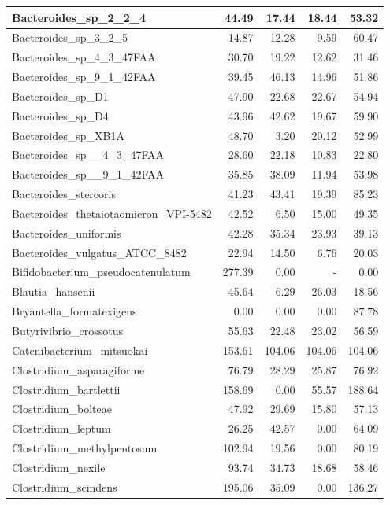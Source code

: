 \documentclass[12pt,a4paper]{article}
\begin{document}
\begin{table}[ht]
\begin{center}
\begin{tabular}{|l*{4}{|r}|}
Bacteroides\_sp\_2\_2\_4 & 44.49 & 17.44 & 18.44 & 53.32 \\ \hline
Bacteroides\_sp\_3\_2\_5 & 14.87 & 12.28 & 9.59 & 60.47 \\ \hline
Bacteroides\_sp\_4\_3\_47FAA & 30.70 & 19.22 & 12.62 & 31.46 \\ \hline
Bacteroides\_sp\_9\_1\_42FAA & 39.45 & 46.13 & 14.96 & 51.86 \\ \hline
Bacteroides\_sp\_D1 & 47.90 & 22.68 & 22.67 & 54.94 \\ \hline
Bacteroides\_sp\_D4 & 43.96 & 42.62 & 19.67 & 59.90 \\ \hline
Bacteroides\_sp\_XB1A & 48.70 & 3.20 & 20.12 & 52.99 \\ \hline
Bacteroides\_sp\_\_4\_3\_47FAA & 28.60 & 22.18 & 10.83 & 22.80 \\ \hline
Bacteroides\_sp\_\_9\_1\_42FAA & 35.85 & 38.09 & 11.94 & 53.98 \\ \hline
Bacteroides\_stercoris & 41.23 & 43.41 & 19.39 & 85.23 \\ \hline
Bacteroides\_thetaiotaomicron\_VPI-5482 & 42.52 & 6.50 & 15.00 & 49.35 \\ \hline
Bacteroides\_uniformis & 42.28 & 35.34 & 23.93 & 39.13 \\ \hline
Bacteroides\_vulgatus\_ATCC\_8482 & 22.94 & 14.50 & 6.76 & 20.03 \\ \hline
Bifidobacterium\_pseudocatenulatum & 277.39 & 0.00 & - & 0.00 \\ \hline
Blautia\_hansenii & 45.64 & 6.29 & 26.03 & 18.56 \\ \hline
Bryantella\_formatexigens & 0.00 & 0.00 & 0.00 & 87.78 \\ \hline
Butyrivibrio\_crossotus & 55.63 & 22.48 & 23.02 & 56.59 \\ \hline
Catenibacterium\_mitsuokai & 153.61 & 104.06 & 104.06 & 104.06 \\ \hline
Clostridium\_asparagiforme & 76.79 & 28.29 & 25.87 & 76.92 \\ \hline
Clostridium\_bartlettii & 158.69 & 0.00 & 55.57 & 188.64 \\ \hline
Clostridium\_bolteae & 47.92 & 29.69 & 15.80 & 57.13 \\ \hline
Clostridium\_leptum & 26.25 & 42.57 & 0.00 & 64.09 \\ \hline
Clostridium\_methylpentosum & 102.94 & 19.56 & 0.00 & 80.19 \\ \hline
Clostridium\_nexile & 93.74 & 34.73 & 18.68 & 58.46 \\ \hline
Clostridium\_scindens & 195.06 & 35.09 & 0.00 & 136.27 \\ \hline

\end{tabular}
\end{center}
\end{table}
\end{document}
